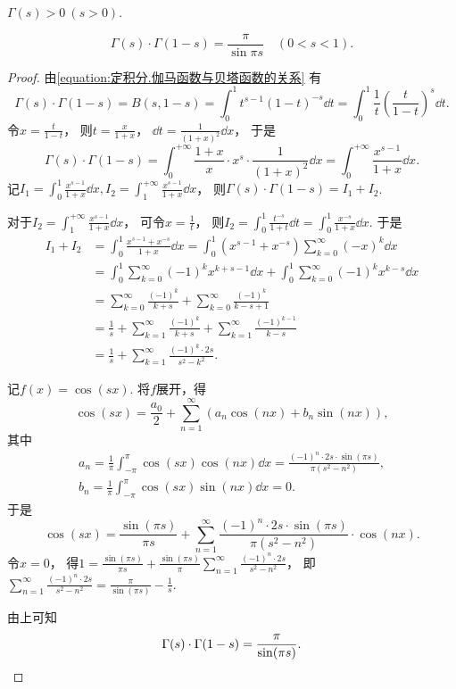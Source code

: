 \begin{proposition}
\(\Gamma(s) > 0\ (s>0)\).
\end{proposition}

\begin{property}[余元公式]
\begin{equation}\label{equation:定积分.余元公式}
	\Gamma(s) \cdot \Gamma(1-s)
	= \frac{\pi}{\sin{\pi s}} \quad (0 < s < 1).
\end{equation}
\begin{proof}
由\cref{equation:定积分.伽马函数与贝塔函数的关系} 有\[
	\Gamma(s) \cdot \Gamma(1-s)
	= B(s,1-s)
	= \int_0^1 t^{s-1} (1-t)^{-s} \dd{t}
	= \int_0^1 \frac1t \left(\frac{t}{1-t}\right)^s \dd{t}.
\]
令\(x=\frac{t}{1-t}\)，
则\(t=\frac{x}{1+x}\)，
\(\dd{t}=\frac1{(1+x)^2} \dd{x}\)，
于是\[
	\Gamma(s) \cdot \Gamma(1-s)
	= \int_0^{+\infty} \frac{1+x}{x} \cdot x^s \cdot \frac1{(1+x)^2} \dd{x}
	= \int_0^{+\infty} \frac{x^{s-1}}{1+x} \dd{x}.
\]
记\(I_1 = \int_0^1 \frac{x^{s-1}}{1+x} \dd{x},
I_2 = \int_1^{+\infty} \frac{x^{s-1}}{1+x} \dd{x}\)，
则\(\Gamma(s) \cdot \Gamma(1-s) = I_1 + I_2\).

对于\(I_2 = \int_1^{+\infty} \frac{x^{s-1}}{1+x} \dd{x}\)，
可令\(x = \frac1t\)，
则\(I_2
= \int_0^1 \frac{t^{-s}}{1+t} \dd{t}
= \int_0^1 \frac{x^{-s}}{1+x} \dd{x}\).
于是\begin{align*}
	I_1 + I_2
	&= \int_0^1 \frac{x^{s-1} + x^{-s}}{1+x} \dd{x}
	= \int_0^1 (x^{s-1} + x^{-s}) \sum_{k=0}^\infty (-x)^k \dd{x} \\%
	&= \int_0^1 \sum_{k=0}^\infty (-1)^k x^{k+s-1} \dd{x}
	+ \int_0^1 \sum_{k=0}^\infty (-1)^k x^{k-s} \dd{x} \\
	&= \sum_{k=0}^\infty \frac{(-1)^k}{k+s}
	+ \sum_{k=0}^\infty \frac{(-1)^k}{k-s+1} \\
	&= \frac1s
	+ \sum_{k=1}^\infty \frac{(-1)^k}{k+s}
	+ \sum_{k=1}^\infty \frac{(-1)^{k-1}}{k-s} \\
	&= \frac1s + \sum_{k=1}^\infty \frac{(-1)^k \cdot 2s}{s^2-k^2}.
\end{align*}

记\(f(x)=\cos(sx)\).
将\(f\)展开，得\[
	\cos(sx) = \frac{a_0}2 + \sum_{n=1}^\infty (a_n \cos(nx) + b_n \sin(nx)),
\]
其中\begin{gather*}
	a_n = \frac1\pi \int_{-\pi}^\pi \cos(sx) \cos(nx) \dd{x}
	= \frac{(-1)^n \cdot 2s \cdot \sin(\pi s)}{\pi(s^2-n^2)}, \\
	b_n = \frac1\pi \int_{-\pi}^\pi \cos(sx) \sin(nx) \dd{x} = 0.
\end{gather*}
于是\[
	\cos(sx) = \frac{\sin(\pi s)}{\pi s}
	+ \sum_{n=1}^\infty \frac{(-1)^n \cdot 2s \cdot \sin(\pi s)}{\pi(s^2-n^2)} \cdot \cos(nx).
\]
令\(x=0\)，
得\(1 = \frac{\sin(\pi s)}{\pi s}
+ \frac{\sin(\pi s)}{\pi} \sum_{n=1}^\infty \frac{(-1)^n \cdot 2s}{s^2-n^2}\)，
即\(\sum_{n=1}^\infty \frac{(-1)^n \cdot 2s}{s^2-n^2} = \frac{\pi}{\sin(\pi s)} - \frac1s\).

由上可知\[
	\Gamma(s) \cdot \Gamma(1-s)
	= \frac{\pi}{\sin(\pi s)}.
	\qedhere
\]
\end{proof}
\end{property}

